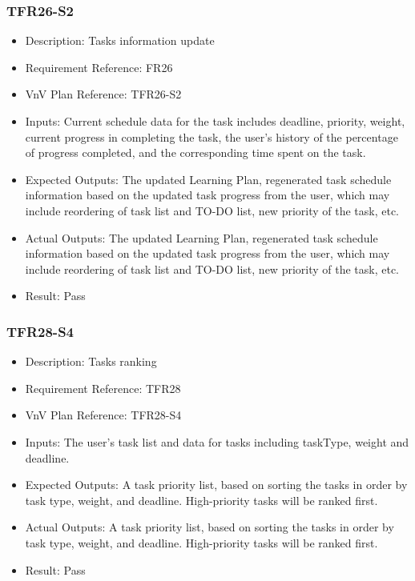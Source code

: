\documentclass[12pt, titlepage]{article}
\begin{document}
\subsubsection{TFR26-S2}\label{3.2.16}
\begin{itemize}
    \item Description: Tasks information update
    \item Requirement Reference: FR26
    \item VnV Plan Reference: TFR26-S2
    \item Inputs: Current schedule data for the task includes deadline, priority, weight,
current progress in completing the task, the user’s history of the percentage of
progress completed, and the corresponding time spent on the task.
    \item Expected Outputs: The updated Learning Plan, regenerated task schedule information
based on the updated task progress from the user, which may include reordering
of task list and TO-DO list, new priority of the task, etc.
    \item Actual Outputs: The updated Learning Plan, regenerated task schedule information
based on the updated task progress from the user, which may include reordering
of task list and TO-DO list, new priority of the task, etc.
    \item Result: Pass
\end{itemize}

\subsubsection{TFR28-S4}\label{3.2.17}
\begin{itemize}
    \item Description: Tasks ranking
    \item Requirement Reference: TFR28
    \item VnV Plan Reference: TFR28-S4
    \item Inputs: The user’s task list and data for tasks including taskType, weight and
deadline.
    \item Expected Outputs: A task priority list, based on sorting the tasks in order by task type,
weight, and deadline. High-priority tasks will be ranked first.
    \item Actual Outputs: A task priority list, based on sorting the tasks in order by task type,
weight, and deadline. High-priority tasks will be ranked first.
    \item Result: Pass
\end{itemize}
\end{document}
